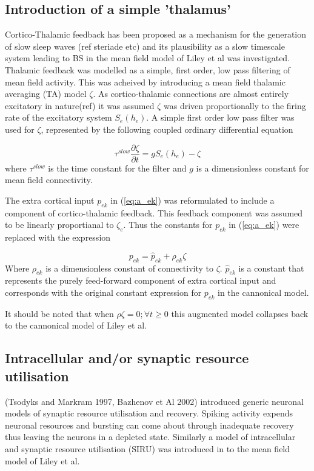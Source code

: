 \documentclass[a4paper,12pt]{article}
\begin{document}
\subsection{Introduction of a simple 'thalamus'}

Cortico-Thalamic feedback has been proposed as a mechanism for the generation of slow sleep waves (ref steriade etc) and its plausibility as a slow timescale system leading to BS in the mean field model of Liley et al was investigated. Thalamic feedback was modelled as a simple, first order, low pass filtering of mean field activity. This was acheived by introducing a mean field  thalamic averaging (TA) model $\zeta$. As cortico-thalamic connections are almost entirely excitatory in nature(ref) it was assumed $\zeta$ was driven proportionally to the firing rate of the excitatory system $S_e(h_e)$.
A simple first order low pass filter was used for $\zeta$, represented by the following coupled ordinary differential equation

\begin{equation} \label{eq:zeta_slow} 
\tau^{slow} \frac{\partial \zeta}{\partial t} = g S_e(h_e) - \zeta
\end{equation}
where $\tau^{slow}$ is the time constant for the filter and $g$ is a dimensionless constant for mean field connectivity.

The extra cortical input $p_{ek}$ in (\ref{eq:a_ek}) was reformulated to include a component of cortico-thalamic feedback. This feedback component was assumed to be linearly proportianal to $\zeta_e$. Thus the constants for $p_{ek}$ in (\ref{eq:a_ek}) were replaced with the expression

\begin{equation} \label{eq:p_ek}
p_{ek} = \hat{p}_{ek} + \rho_{ek} \zeta
\end{equation}
\noindent
Where $\rho_{ek}$ is a dimensionless constant of connectivity to $\zeta$. $\hat{p}_{ek}$ is a constant that represents
the purely feed-forward component of extra cortical input and corresponds with the original constant expression for $p_{ek}$ in the cannonical model. 

It should be noted that when $\rho\zeta=0; \forall t \geq 0$ this augmented model collapses back to the cannonical model of Liley et al.

\subsection{Intracellular and/or synaptic resource utilisation}
(Tsodyks and Markram 1997, Bazhenov et Al 2002) introduced generic neuronal models of synaptic resource utilisation and recovery. Spiking activity expends neuronal resources and bursting can come about through inadequate recovery thus leaving the neurons in a depleted state.  Similarly a model of intracellular and synaptic resource utilisation (SIRU) was introduced in to the mean field model of Liley et al. 
\end{document}
